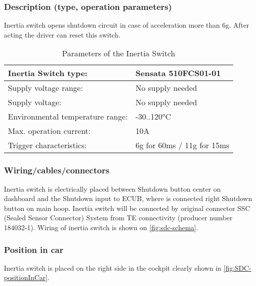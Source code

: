 \subsubsection{Description (type, operation parameters)}
\iffalse Describe the Inertia Switch used and use a table for the common operation parameters, like supply voltage, temperature, etc.
Additionally, fill out the following table replacing the values with your specification: \fi

Inertia switch opens shutdown circuit in case of acceleration more than 6g. After acting the driver can reset this switch.
\begin{table}[H]
	\centering
	\caption{Parameters of the Inertia Switch}
	\begin{tabularx}{\textwidth}{|X|l|}
	\hline	Inertia Switch type: & Sensata 510FCS01-01 \\[\TableSize]
	\hline	Supply voltage range: & No supply needed \\[\TableSize]
	\hline	Supply voltage: & No supply needed \\[\TableSize]
	\hline	Environmental temperature range: & -30..120°C \\[\TableSize]
	\hline	Max. operation current: & 10A \\[\TableSize]
	\hline	Trigger characteristics: & 6g for 60ms / 11g for 15ms \\[\TableSize]
	\hline
	\end{tabularx}%
	\label{tab:inertiaSwitch}%
\end{table}%


\subsubsection{Wiring/cables/connectors}

Inertia switch is electrically placed between Shutdown button center on dashboard and the Shutdown input to ECUB, where is connected right Shutdown button on main hoop. Inertia switch will be connected by original connector SSC (Sealed Sensor Connector) System from TE connectivity (producer number 184032-1). Wiring of inertia switch is shown on \ref{fig:sdc-schema}.
\subsubsection{Position in car}

Inertia switch is placed on the right side in the cockpit clearly shown in \ref{fig:SDC-positionInCar}.